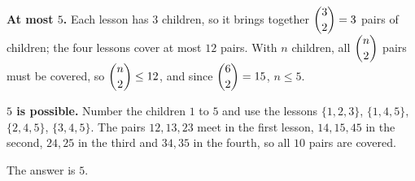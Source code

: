 \textbf{At most $5$.} Each lesson has $3$ children, so it brings together $\dbinom32=3$ pairs of children; the four lessons cover at most $12$ pairs. With $n$ children, all $\dbinom n2$ pairs must be covered, so $\dbinom n2\le12$, and since $\dbinom62=15$, $n\le5$.

\textbf{$5$ is possible.} Number the children $1$ to $5$ and use the lessons $\{1,2,3\}$, $\{1,4,5\}$, $\{2,4,5\}$, $\{3,4,5\}$. The pairs $12,13,23$ meet in the first lesson, $14,15,45$ in the second, $24,25$ in the third and $34,35$ in the fourth, so all $10$ pairs are covered.

The answer is $\boxed{5}$.
